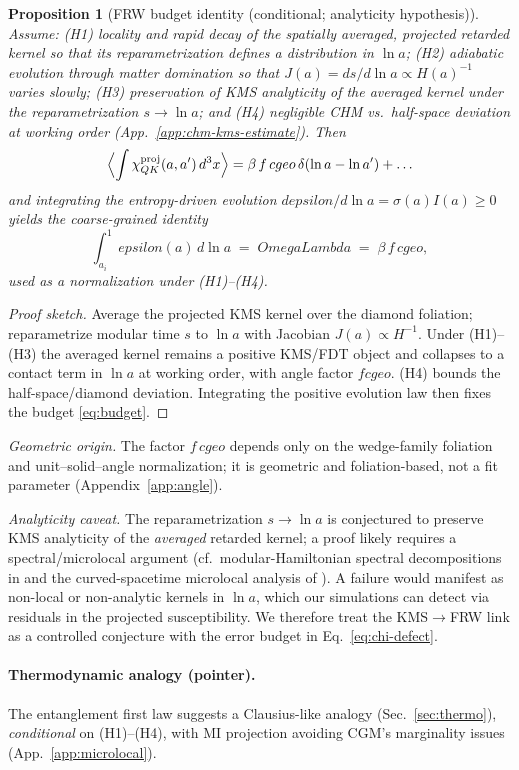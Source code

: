 \documentclass[aps,prd,onecolumn,superscriptaddress,nofootinbib]{revtex4-2}
\def\OmL{OmegaLambda}%
\def\cgeo{cgeo}%
\def\eps{epsilon}%
\def\Omega_\Lambda{OmegaLambda}%
\providecommand{\OmL}{\Omega_\Lambda}
\providecommand{\cgeo}{c_{\rm geo}}
\providecommand{\eps}{\varepsilon}
\providecommand{\be}{\begin{equation}}
\providecommand{\ee}{\end{equation}}
\newtheorem{proposition}{Proposition}
\begin{document}
\begin{proposition}[FRW budget identity (conditional; analyticity hypothesis)]
\label{prop:frw-budget}
Assume: (H1) locality and rapid decay of the spatially averaged, projected retarded kernel so that its reparametrization defines a distribution in $\ln a$; (H2) adiabatic evolution through matter domination so that $J(a)=ds/d\ln a\propto H(a)^{-1}$ varies slowly; (H3) preservation of KMS analyticity of the averaged kernel under the reparametrization $s\!\to\!\ln a$; and (H4) negligible CHM vs.\ half-space deviation at working order (App.~\ref{app:chm-kms-estimate}). Then
\[
\Big\langle \!\int \chi^{\rm proj}_{QK}(a,a')\,d^3x \Big\rangle
= \beta\, f\, \cgeo\, \delta(\ln a-\ln a') + \ldots
\]
and integrating the entropy-driven evolution $d\eps/d\ln a=\sigma(a)I(a)\ge0$ yields the coarse-grained identity
\be
\int_{a_i}^{1}\!\eps(a)\,d\ln a \;=\; \OmL \;=\; \beta\, f\,\cgeo,
\label{eq:budget}
\ee
used as a normalization under (H1)–(H4).
\end{proposition}
\begin{proof}[Proof sketch]
Average the projected KMS kernel over the diamond foliation; reparametrize modular time $s$ to $\ln a$ with Jacobian $J(a)\propto H^{-1}$. Under (H1)–(H3) the averaged kernel remains a positive KMS/FDT object and collapses to a contact term in $\ln a$ at working order, with angle factor $f\cgeo$. (H4) bounds the half-space/diamond deviation. Integrating the positive evolution law then fixes the budget \eqref{eq:budget}.
\end{proof}
\noindent\emph{Geometric origin.} The factor $f\,\cgeo$ depends only on the wedge-family foliation and unit–solid–angle normalization; it is geometric and foliation-based, not a fit parameter (Appendix~\ref{app:angle}).
\smallskip

\noindent\emph{Analyticity caveat.} The reparametrization \(s\to\ln a\) is conjectured to preserve KMS analyticity of the \emph{averaged} retarded kernel; a proof likely requires a spectral/microlocal argument (cf.\ modular-Hamiltonian spectral decompositions in \cite{CasiniRelative} and the curved-spacetime microlocal analysis of \cite{HollandsWald2001}). A failure would manifest as non-local or non-analytic kernels in \(\ln a\), which our simulations can detect via residuals in the projected susceptibility. We therefore treat the KMS\(\to\)FRW link as a controlled conjecture with the error budget in Eq.~\eqref{eq:chi-defect}.

\paragraph{Thermodynamic analogy (pointer).}
The entanglement first law suggests a Clausius-like analogy (Sec.~\ref{sec:thermo}), \emph{conditional} on (H1)–(H4), with MI projection avoiding CGM’s marginality issues (App.~\ref{app:microlocal}).
\end{document}
